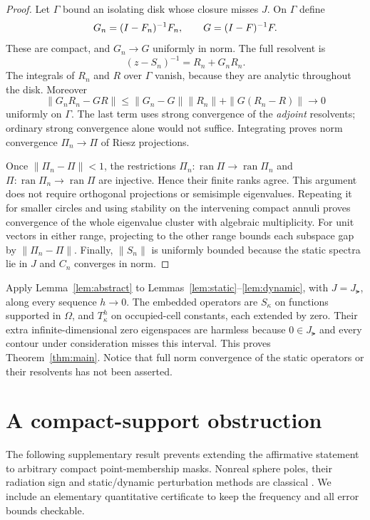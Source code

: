 \documentclass[11pt]{article}
\theoremstyle{remark}\newtheorem{remark}[theorem]{Remark}
\newcommand{\ran}{\operatorname{ran}}\newcommand{\tr}{\operatorname{tr}}
\begin{document}
\begin{proof}
Let $\Gamma$ bound an isolating disk whose closure misses $J$. On $\Gamma$ define
\[
 G_n=(I-F_n)^{-1}F_n,\qquad G=(I-F)^{-1}F.
\]
These are compact, and $G_n\to G$ uniformly in norm. The full resolvent is
\begin{equation}\label{eq:resolvent}
 (z-S_n)^{-1}=R_n+G_nR_n.
\end{equation}
The integrals of $R_n$ and $R$ over $\Gamma$ vanish, because they are analytic throughout the disk. Moreover
\[
 \|G_nR_n-GR\|\le\|G_n-G\|\|R_n\|+\|G(R_n-R)\|\longrightarrow0
\]
uniformly on $\Gamma$. The last term uses strong convergence of the \emph{adjoint} resolvents; ordinary strong convergence alone would not suffice. Integrating proves norm convergence $\Pi_n\to\Pi$ of Riesz projections.

Once $\|\Pi_n-\Pi\|<1$, the restrictions $\Pi_n:\ran\Pi\to\ran\Pi_n$ and $\Pi:\ran\Pi_n\to\ran\Pi$ are injective. Hence their finite ranks agree. This argument does not require orthogonal projections or semisimple eigenvalues. Repeating it for smaller circles and using stability on the intervening compact annuli proves convergence of the whole eigenvalue cluster with algebraic multiplicity. For unit vectors in either range, projecting to the other range bounds each subspace gap by $\|\Pi_n-\Pi\|$. Finally, $\|S_n\|$ is uniformly bounded because the static spectra lie in $J$ and $C_n$ converges in norm.
\end{proof}

Apply Lemma~\ref{lem:abstract} to Lemmas~\ref{lem:static}--\ref{lem:dynamic}, with $J=J_\lat$, along every sequence $h\to0$. The embedded operators are $S_\kappa$ on functions supported in $\Omega$, and $T_\kappa^h$ on occupied-cell constants, each extended by zero. Their extra infinite-dimensional zero eigenspaces are harmless because $0\in J_\lat$ and every contour under consideration misses this interval. This proves Theorem~\ref{thm:main}. Notice that full norm convergence of the static operators or their resolvents has not been asserted.

\section{A compact-support obstruction}\label{sec:counterexample}

The following supplementary result prevents extending the affirmative statement to arbitrary compact point-membership masks. Nonreal sphere poles, their radiation sign and static/dynamic perturbation methods are classical \cite{Rahola,AM,ALZ,Mie,Zhou}. We include an elementary quantitative certificate to keep the frequency and all error bounds checkable.
\end{document}
